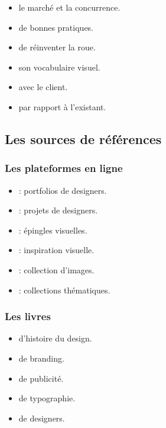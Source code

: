 \begin{itemize}
    \item {} le marché et la concurrence.
    \item {} de bonnes pratiques.
    \item {} de réinventer la roue.
    \item {} son vocabulaire visuel.
    \item {} avec le client.
    \item {} par rapport à l'existant.
\end{itemize}

\subsection{Les sources de références}

\subsubsection{Les plateformes en ligne}

\begin{itemize}
    \item {} : portfolios de designers.
    \item {} : projets de designers.
    \item {} : épingles visuelles.
    \item {} : inspiration visuelle.
    \item {} : collection d'images.
    \item {} : collections thématiques.
\end{itemize}

\subsubsection{Les livres}

\begin{itemize}
    \item {} d'histoire du design.
    \item {} de branding.
    \item {} de publicité.
    \item {} de typographie.
    \item {} de designers.
\end{itemize}

